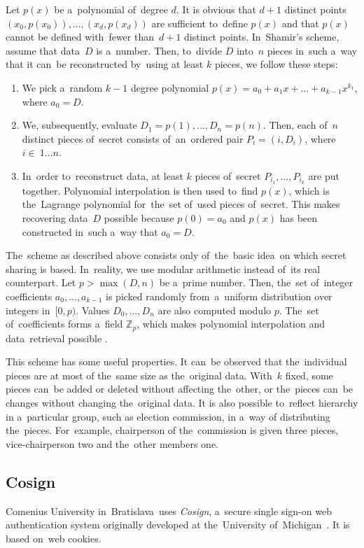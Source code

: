 Let $p(x)$ be a~polynomial of~degree $d$. It is obvious that $d+1$ distinct points $(x_0, p(x_0)),...,(x_d, p(x_d))$ are sufficient to~define $p(x)$ and that $p(x)$ cannot be defined with~fewer than~$d+1$ distinct points. 
\bigbreak
In~Shamir's scheme, assume that data~$D$ is a~number. Then, to~divide $D$ into~$n$ pieces in~such a~way that it can~be reconstructed by~using at least $k$ pieces, we follow these steps:
\begin{enumerate}
\item We pick a~random $k-1$ degree polynomial $p(x) = a_0 + a_1x + ... + a_{k-1}x^{k_1}$, where $a_0 = D$. 
\item We, subsequently, evaluate $D_1 = p(1), ..., D_n = p(n)$. Then, each of~$n$ distinct pieces of~secret consists of~an~ordered pair $P_i = (i, D_i)$, where $i \in~1...n$.
\item In~order to~reconstruct data, at least $k$ pieces of~secret $P_{i_1}, ... , P_{i_k}$ are put together. Polynomial interpolation is then used to~find $p(x)$, which is the~Lagrange polynomial for~the~set of~used pieces of~secret. This makes recovering data~$D$ possible because $p(0) = a_0$ and $p(x)$ has been constructed in~such a~way that $a_0 = D$.
\end{enumerate}
The~scheme as described above consists only of~the~basic idea~on which secret sharing is based. In~reality, we use modular arithmetic instead of~its real counterpart. Let $p > \max(D, n)$ be a~prime number. Then, the~set of~integer coefficients $a_0, ..., a_{k-1}$ is picked randomly from~a~uniform distribution over integers in~$[0, p)$. Values $D_0, ..., D_n$ are also computed modulo $p$. The~set of~coefficients forms a~field $\mathbb{Z}_p$, which makes polynomial interpolation and data~retrieval possible \cite{Shamir}.

This scheme has some useful properties. It can~be observed that the~individual pieces are at most of the~same size as the~original data. With~$k$ fixed,  some pieces can~be added or deleted without affecting the~other, or the~pieces can~be changes without changing the~original data. It is also possible to~reflect hierarchy in a~particular group, such as election commission, in a~way of distributing the~pieces. For~example, chairperson of the~commission is given three pieces, vice-chairperson two and the~other members one.
\subsection{Cosign}
Comenius University in~Bratislava~uses \emph{Cosign}, a~secure single sign-on web authentication system originally developed at the~University of~Michigan~\cite{Cosign}. It is based on~web cookies. 

